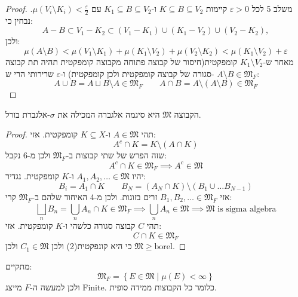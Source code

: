 \documentclass{tstextbook}
\begin{document}
\begin{proof}
משלב 5 לכל \(\varepsilon>0\) קיימות \(K\subseteq B \subseteq V_{2}\) ו-\(K_{1} \subseteq B \subseteq V_{2}\) עם \(\mu\left( V_{i}\setminus K_{i} \right)<\frac{\varepsilon}{2}\). נבחין כי:
$$A-B\subset V_{1}-K_{2}\subset(V_{1}-K_{1})\cup(K_{1}-V_{2})\cup(V_{2}-K_{2}),$$
ולכן:
$$\mu\left( A\setminus  B \right)< \mu\left( V_{1} \setminus  K_{1} \right)+\mu\left( K_{1} \setminus  V_{2} \right)+\mu\left( V_{2}\setminus  K_{2} \right)< \mu\left( K_{1} \setminus  V_{2} \right)+\varepsilon$$
מאחר ש-\(K_{1} \setminus V_{2}\) קומפקטית(חיסור של קבוצה פתוחה מקבוצה קומפקטית תהיה תת קבוצה סגורה של קבוצה קומפקטית ולכן קומפקטית) ו-\(\varepsilon\) שרירותי הרי ש- \(A \setminus B \in \mathfrak{M}_{F}\):
$$A\cup B = A \sqcup B \setminus  A \in \mathfrak{ M} _{F} \qquad  A \cap B = A \setminus  \left( A \setminus  B \right)\in \mathfrak{ M} _{F}$$

\end{proof}
\begin{lemma}[שלב 7]
הקבוצה \(\mathfrak{M}\) היא סיגמה אלגברה המכילה את \(\sigma\)-אלגברת בורל.

\end{lemma}
\begin{proof}
תהי \(A\in \mathfrak{ M}\) ו-\(K \subseteq X\) קומפקטית. אזי:
$$A^{c}\cap K = K \setminus  \left( A \cap K \right)$$
שזה הפרש של שתי קבוצות ב-\(\mathfrak{M}_{F}\) ולכן מ-6 נקבל:
$$A^{c}\cap K \in \mathfrak{M} _{F}\implies A^{c}\in \mathfrak{M} $$
יהיו \(A_{1},A_{2},\dots \in \mathfrak{M}\) ו-\(K\) קומפקטית. נגדיר:
$$B_{i}=A_{1} \cap K\qquad  B_{N}=\left( A_{N}\cap K \right)\setminus \left( B_{1} \cup \dots B_{N-1} \right)$$
אזי \(B_{1},B_{2},\dots \in \mathfrak{M}_{F}\) זרים בזוגות. ולכן מ-4 האיחוד שלהם ב-\(\mathfrak{M}_{F}\) קרי:
$$\bigsqcup_{n}B_{n}= \bigcup_{n} A_{n}\cap K \in \mathfrak{M} _{F}  \implies \bigcup_{n} A_{n}  \in \mathfrak{ M} \implies \mathfrak{ M} \text{ is sigma algebra}$$
תהי \(C\) קבוצה סגורה כלשהי ו-\(K\) קומפקטית. אזי:
$$C\cap K \in \mathfrak{M} _{F}$$
כי היא קונפקטית(2) ולכן \(C_{1} \in \mathfrak{M}\) ולכן \(\mathfrak{M}\geq \text{borel}\).

\end{proof}
\begin{lemma}[שלב 8]
מתקיים:
$$\mathfrak{M} _{F}=\left\{  E \in \mathfrak{M} \mid \mu(E)< \infty  \right\}$$
ולכן למעשה ה-\(F\) מייצג Finite. כלומר כל הקבוצות ממידה סופית.

\end{lemma}
\end{document}
